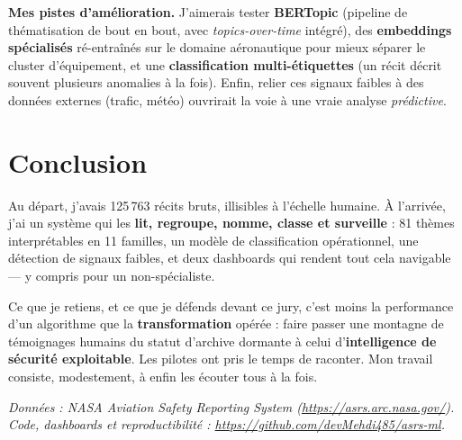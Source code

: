 \documentclass[11pt,a4paper]{article}
\begin{document}
\noindent\textbf{Mes pistes d'amélioration.} J'aimerais tester \textbf{BERTopic} (pipeline de
thématisation de bout en bout, avec \emph{topics-over-time} intégré), des
\textbf{embeddings spécialisés} ré-entraînés sur le domaine aéronautique pour mieux séparer
le cluster d'équipement, et une \textbf{classification multi-étiquettes} (un récit décrit
souvent plusieurs anomalies à la fois). Enfin, relier ces signaux faibles à des données
externes (trafic, météo) ouvrirait la voie à une vraie analyse \emph{prédictive}.

\section{Conclusion}

Au départ, j'avais 125\,763 récits bruts, illisibles à l'échelle humaine. À l'arrivée,
j'ai un système qui les \textbf{lit, regroupe, nomme, classe et surveille} : 81 thèmes
interprétables en 11 familles, un modèle de classification opérationnel, une détection de
signaux faibles, et deux dashboards qui rendent tout cela navigable — y compris pour un
non-spécialiste.

Ce que je retiens, et ce que je défends devant ce jury, c'est moins la performance d'un
algorithme que la \textbf{transformation} opérée : faire passer une montagne de témoignages
humains du statut d'archive dormante à celui d'\textbf{intelligence de sécurité
exploitable}. Les pilotes ont pris le temps de raconter. Mon travail consiste, modestement,
à enfin les écouter tous à la fois.

\vfill
\noindent\footnotesize\textit{Données : NASA Aviation Safety Reporting System
(\url{https://asrs.arc.nasa.gov/}). Code, dashboards et reproductibilité :
\url{https://github.com/devMehdi485/asrs-ml}.}
\end{document}
